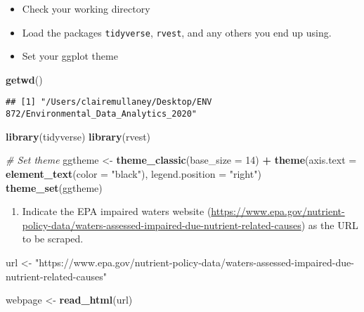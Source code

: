 \documentclass[]{article}
\newenvironment{Shaded}{\begin{snugshade}}{\end{snugshade}}
\newcommand{\CommentTok}[1]{\textcolor[rgb]{0.56,0.35,0.01}{\textit{#1}}}
\newcommand{\DataTypeTok}[1]{\textcolor[rgb]{0.13,0.29,0.53}{#1}}
\newcommand{\DecValTok}[1]{\textcolor[rgb]{0.00,0.00,0.81}{#1}}
\newcommand{\KeywordTok}[1]{\textcolor[rgb]{0.13,0.29,0.53}{\textbf{#1}}}
\newcommand{\NormalTok}[1]{#1}
\newcommand{\OperatorTok}[1]{\textcolor[rgb]{0.81,0.36,0.00}{\textbf{#1}}}
\newcommand{\StringTok}[1]{\textcolor[rgb]{0.31,0.60,0.02}{#1}}
\providecommand{\tightlist}{%
  \setlength{\itemsep}{0pt}\setlength{\parskip}{0pt}}
\begin{document}
\begin{itemize}
\tightlist
\item
  Check your working directory
\item
  Load the packages \texttt{tidyverse}, \texttt{rvest}, and any others
  you end up using.
\item
  Set your ggplot theme
\end{itemize}

\begin{Shaded}
\begin{Highlighting}[]
\KeywordTok{getwd}\NormalTok{()}
\end{Highlighting}
\end{Shaded}

\begin{verbatim}
## [1] "/Users/clairemullaney/Desktop/ENV 872/Environmental_Data_Analytics_2020"
\end{verbatim}

\begin{Shaded}
\begin{Highlighting}[]
\KeywordTok{library}\NormalTok{(tidyverse)}
\KeywordTok{library}\NormalTok{(rvest)}

\CommentTok{# Set theme}
\NormalTok{ggtheme <-}\StringTok{ }\KeywordTok{theme_classic}\NormalTok{(}\DataTypeTok{base_size =} \DecValTok{14}\NormalTok{) }\OperatorTok{+}\StringTok{ }
\StringTok{  }\KeywordTok{theme}\NormalTok{(}\DataTypeTok{axis.text =} \KeywordTok{element_text}\NormalTok{(}\DataTypeTok{color =} \StringTok{"black"}\NormalTok{),}
        \DataTypeTok{legend.position =} \StringTok{"right"}\NormalTok{)}
\KeywordTok{theme_set}\NormalTok{(ggtheme)}
\end{Highlighting}
\end{Shaded}

\begin{enumerate}
\def\labelenumi{\arabic{enumi}.}
\setcounter{enumi}{1}
\tightlist
\item
  Indicate the EPA impaired waters website
  (\url{https://www.epa.gov/nutrient-policy-data/waters-assessed-impaired-due-nutrient-related-causes})
  as the URL to be scraped.
\end{enumerate}

\begin{Shaded}
\begin{Highlighting}[]
\NormalTok{url <-}\StringTok{ "https://www.epa.gov/nutrient-policy-data/waters-assessed-impaired-due-nutrient-related-causes"}

\NormalTok{webpage <-}\StringTok{ }\KeywordTok{read_html}\NormalTok{(url)}
\end{Highlighting}
\end{Shaded}
\end{document}
